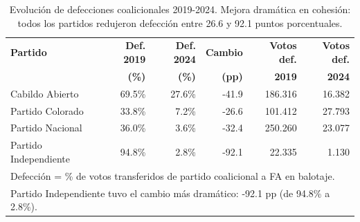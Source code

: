 \begin{table}[H]
\centering
\caption{Evolución de defecciones coalicionales 2019-2024. Mejora dramática en cohesión: todos los partidos redujeron defección entre 26.6 y 92.1 puntos porcentuales.}
\label{tab:comparison_2019_2024}
\small
\begin{tabular}{lrrrrr}
\toprule
\textbf{Partido} & \textbf{Def. 2019} & \textbf{Def. 2024} & \textbf{Cambio} & \textbf{Votos def.} & \textbf{Votos def.} \\
 & \textbf{(\%)} & \textbf{(\%)} & \textbf{(pp)} & \textbf{2019} & \textbf{2024} \\
\midrule
Cabildo Abierto & 69.5\% & 27.6\% & -41.9 & 186.316 & 16.382 \\
Partido Colorado & 33.8\% & 7.2\% & -26.6 & 101.412 & 27.793 \\
Partido Nacional & 36.0\% & 3.6\% & -32.4 & 250.260 & 23.077 \\
Partido Independiente & 94.8\% & 2.8\% & -92.1 & 22.335 & 1.130 \\
\bottomrule
\multicolumn{6}{l}{\footnotesize Defección = \% de votos transferidos de partido coalicional a FA en balotaje.} \\
\multicolumn{6}{l}{\footnotesize Partido Independiente tuvo el cambio más dramático: -92.1 pp (de 94.8\% a 2.8\%).} \\
\end{tabular}
\end{table}
